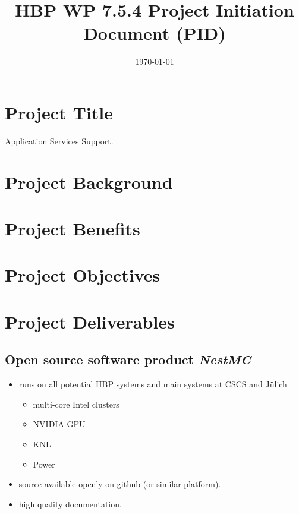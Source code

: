 \documentclass[11pt,a4paper]{article}
\begin{document}
\title{HBP WP 7.5.4 Project Initiation Document (PID)}
\date{\today}
\maketitle

\section{Project Title}
Application Services Support.

\section{Project Background}

\section{Project Benefits}


\section{Project Objectives}

\section{Project Deliverables}
\subsection{Open source software product \emph{NestMC}}

\begin{itemize}
    \item   runs on all potential HBP systems and main systems at CSCS and J\"ulich
    \begin{itemize}
        \item   multi-core Intel clusters
        \item   NVIDIA GPU
        \item   KNL
        \item   Power
    \end{itemize}
    \item   source available openly on github (or similar platform).
    \item   high quality documentation.
\end{itemize}
\end{document}
